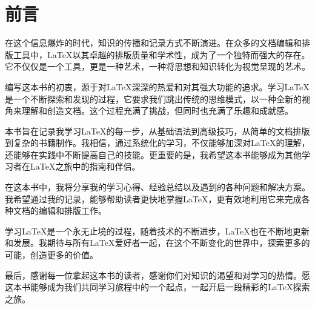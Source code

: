 \chapter*{前言}
在这个信息爆炸的时代，知识的传播和记录方式不断演进。在众多的文档编辑和排版工具中，\LaTeX 以其卓越的排版质量和学术性，成为了一个独特而强大的存在。它不仅仅是一个工具，更是一种艺术，一种将思想和知识转化为视觉呈现的艺术。

编写这本书的初衷，源于对\LaTeX 深深的热爱和对其强大功能的追求。学习\LaTeX 是一个不断探索和发现的过程，它要求我们跳出传统的思维模式，以一种全新的视角来理解和创造文档。这个过程充满了挑战，但同时也充满了乐趣和成就感。

本书旨在记录我学习\LaTeX 的每一步，从基础语法到高级技巧，从简单的文档排版到复杂的书籍制作。我相信，通过系统化的学习，不仅能够加深对\LaTeX 的理解，还能够在实践中不断提高自己的技能。更重要的是，我希望这本书能够成为其他学习者在\LaTeX 之旅中的指南和伴侣。

在这本书中，我将分享我的学习心得、经验总结以及遇到的各种问题和解决方案。我希望通过我的记录，能够帮助读者更快地掌握\LaTeX ，更有效地利用它来完成各种文档的编辑和排版工作。

学习\LaTeX 是一个永无止境的过程，随着技术的不断进步，\LaTeX 也在不断地更新和发展。我期待与所有\LaTeX 爱好者一起，在这个不断变化的世界中，探索更多的可能，创造更多的价值。

最后，感谢每一位拿起这本书的读者，感谢你们对知识的渴望和对学习的热情。愿这本书能够成为我们共同学习旅程中的一个起点，一起开启一段精彩的\LaTeX 探索之旅。
